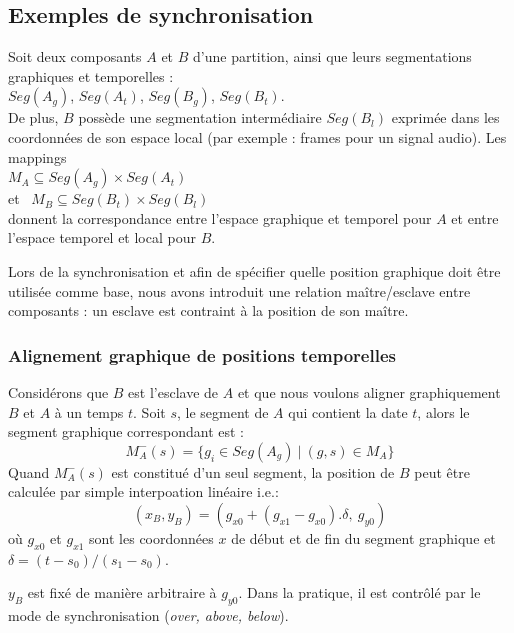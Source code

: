 \documentclass{article}
\newcommand{\seg}[1]			{Seg(#1)}
\newcommand{\rshift}			{\hspace*{4mm}}
\begin{document}
\subsection{Exemples de synchronisation}

Soit deux composants $A$ et $B$ d'une partition, ainsi que leurs segmentations graphiques et temporelles : \\
\rshift $\seg{A_g}$, $\seg{A_t}$, $\seg{B_g}$, $\seg{B_t}$. \\
De plus, $B$ possède une segmentation intermédiaire $\seg{B_l}$ exprimée dans les coordonnées de son espace local (par exemple : frames pour un signal audio).
Les mappings \\
\vspace{1mm}
\rshift $M_A \subseteq \seg{A_{g}}\times \seg{A_{t}}$ \\
et \ $M_B \subseteq \seg{B_{t}}\times \seg{B_{l}}$ \\
donnent la correspondance entre l'espace graphique et temporel pour $A$ 
et entre l'espace temporel et local pour $B$.

Lors de la synchronisation et afin de spécifier quelle position graphique doit être utilisée comme base, nous avons introduit une relation maître/esclave entre composants : un esclave est contraint à la position de son maître.

\subsubsection{Alignement graphique de positions temporelles}

Considérons que $B$ est l'esclave de $A$ et que nous voulons aligner graphiquement $B$ et $A$ à un temps $t$.
Soit $s$, le segment de $A$ qui contient la date $t$, alors le segment graphique correspondant est :
\[
M_A^{-}(s) =\{ g_i \in \seg{A_{g}}\ |\ (g,s)\in M_A\}
\]
Quand $M_A^{-}(s)$ est constitué d'un seul segment, la position de $B$ peut être calculée par simple interpoation linéaire i.e.:
\[
(x_B, y_B) = (g_{x0} + (g_{x1} - g_{x0}). \delta,\ g_{y0})
\]
où $g_{x0}$ et $g_{x1}$ sont les coordonnées $x$ de début et de fin du segment graphique et 
$\delta = (t - s_0) / (s_1 - s_0)$.

$y_B$ est fixé de manière arbitraire à $g_{y0}$. Dans la pratique, il est contrôlé par le mode de synchronisation  (\textit{over, above, below}).
\end{document}
